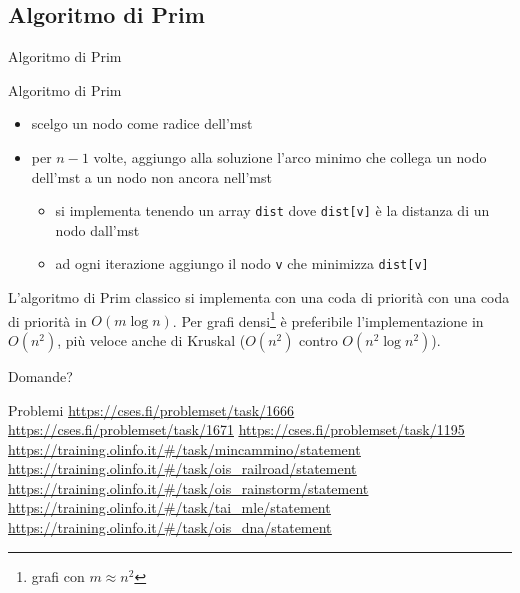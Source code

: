 \documentclass[compress]{beamer}
\begin{document}
\subsection{Algoritmo di Prim}
\begin{frame}{Algoritmo di Prim}
    \begin{block}{Algoritmo di Prim}
        \begin{itemize}
            \item scelgo un nodo come radice dell'mst
            \item per $n-1$ volte, aggiungo alla soluzione l'arco minimo che collega un nodo dell'mst a un nodo non ancora nell'mst
            \begin{itemize}
                \item si implementa tenendo un array \texttt{dist} dove \texttt{dist[v]} \`e la distanza di un nodo dall'mst
                \item ad ogni iterazione aggiungo il nodo \texttt{v} che minimizza \texttt{dist[v]}
            \end{itemize}
        \end{itemize}
    \end{block}
    \pause
    L'algoritmo di Prim classico si implementa con una coda di priorit\`a con una coda di priorit\`a in $O(m \log n)$.
    \vfill
    Per grafi densi\footnote{grafi con $m \approx n^2$} \`e preferibile l'implementazione in $O(n^2)$, pi\`u veloce anche di Kruskal ($O(n^2)$ contro $O(n^2 \log n^2)$).
\end{frame}

\begin{frame}{Domande?}
  \tableofcontents
\end{frame}

\begin{frame}{Problemi}{}
    \underline{\url{https://cses.fi/problemset/task/1666}}
    \underline{\url{https://cses.fi/problemset/task/1671}}
    \underline{\url{https://cses.fi/problemset/task/1195}}
    \underline{\url{https://training.olinfo.it/\#/task/mincammino/statement}}
    \underline{\url{https://training.olinfo.it/\#/task/ois_railroad/statement}}
    \underline{\url{https://training.olinfo.it/\#/task/ois_rainstorm/statement}}
    \underline{\url{https://training.olinfo.it/\#/task/tai_mle/statement}}
    \underline{\url{https://training.olinfo.it/\#/task/ois_dna/statement}}
\end{frame}
\end{document}
